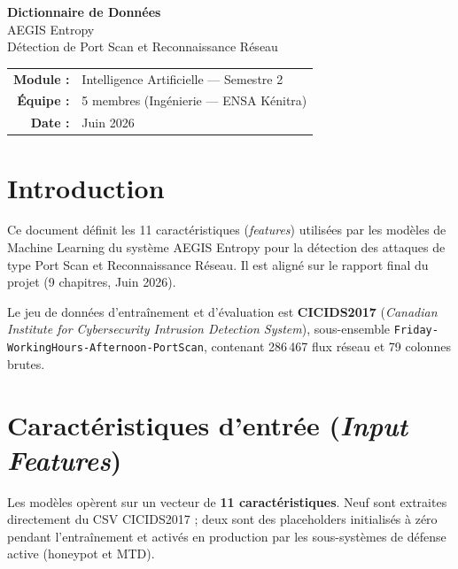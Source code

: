 \documentclass[12pt,a4paper]{article}
\begin{document}
\begin{center}
  {\Large\bfseries Dictionnaire de Donn\'{e}es}\\[0.6em]
  {\large AEGIS Entropy}\\[0.3em]
  {\large D\'{e}tection de Port Scan et Reconnaissance R\'{e}seau}\\[1.2em]
  \begin{tabular}{rl}
    \textbf{Module :}  & Intelligence Artificielle --- Semestre 2 \\
    \textbf{\'{E}quipe :} & 5 membres (Ing\'{e}nierie --- ENSA K\'{e}nitra) \\
    \textbf{Date :}    & Juin 2026 \\
  \end{tabular}
\end{center}

\vspace{1em}

\section{Introduction}

Ce document d\'{e}finit les 11 caract\'{e}ristiques (\textit{features}) utilis\'{e}es par
les mod\`{e}les de Machine Learning du syst\`{e}me AEGIS Entropy pour la d\'{e}tection
des attaques de type Port Scan et Reconnaissance R\'{e}seau. Il est align\'{e} sur le
rapport final du projet (9 chapitres, Juin 2026).

Le jeu de donn\'{e}es d'entra\^{i}nement et d'\'{e}valuation est
\textbf{CICIDS2017} (\textit{Canadian Institute for Cybersecurity Intrusion Detection
System}), sous-ensemble \texttt{Friday-WorkingHours-Afternoon-PortScan}, contenant
286\,467 flux r\'{e}seau et 79 colonnes brutes.

\section{Caract\'{e}ristiques d'entr\'{e}e (\textit{Input Features})}

Les mod\`{e}les op\`{e}rent sur un vecteur de \textbf{11 caract\'{e}ristiques}.
Neuf sont extraites directement du CSV CICIDS2017 ; deux sont des placeholders
initialis\'{e}s \`{a} z\'{e}ro pendant l'entra\^{i}nement et activ\'{e}s en production
par les sous-syst\`{e}mes de d\'{e}fense active (honeypot et MTD).
\end{document}
